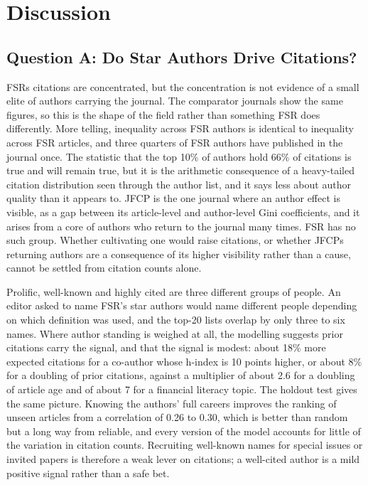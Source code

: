 \documentclass[11pt,a4paper]{article}
\begin{document}
\section{Discussion}\label{discussion}

\subsection{Question A: Do Star Authors Drive Citations?}\label{question-a-do-star-authors-drive-citations-1}

FSR\textquotesingle s citations are concentrated, but the concentration is not evidence of a small elite of authors carrying the journal. The comparator journals show the same figures, so this is the shape of the field rather than something FSR does differently. More telling, inequality across FSR authors is identical to inequality across FSR articles, and three quarters of FSR authors have published in the journal once. The statistic that the top 10\% of authors hold 66\% of citations is true and will remain true, but it is the arithmetic consequence of a heavy-tailed citation distribution seen through the author list, and it says less about author quality than it appears to. JFCP is the one journal where an author effect is visible, as a gap between its article-level and author-level Gini coefficients, and it arises from a core of authors who return to the journal many times. FSR has no such group. Whether cultivating one would raise citations, or whether JFCP\textquotesingle s returning authors are a consequence of its higher visibility rather than a cause, cannot be settled from citation counts alone.

Prolific, well-known and highly cited are three different groups of people. An editor asked to name FSR's star authors would name different people depending on which definition was used, and the top-20 lists overlap by only three to six names. Where author standing is weighed at all, the modelling suggests prior citations carry the signal, and that the signal is modest: about 18\% more expected citations for a co-author whose h-index is 10 points higher, or about 8\% for a doubling of prior citations, against a multiplier of about 2.6 for a doubling of article age and of about 7 for a financial literacy topic. The holdout test gives the same picture. Knowing the authors' full careers improves the ranking of unseen articles from a correlation of 0.26 to 0.30, which is better than random but a long way from reliable, and every version of the model accounts for little of the variation in citation counts. Recruiting well-known names for special issues or invited papers is therefore a weak lever on citations; a well-cited author is a mild positive signal rather than a safe bet.
\end{document}
